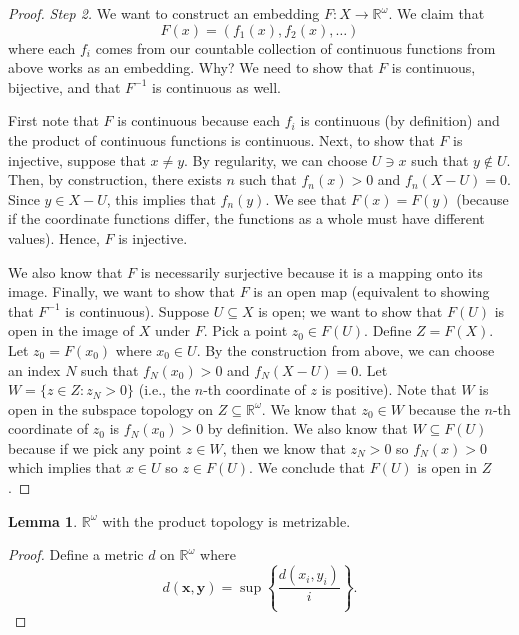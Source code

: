 \documentclass{article}
\newcommand{\nline}{\vspace*{0.5\baselineskip}}
\theoremstyle{definition}
\newtheorem{lemma}{Lemma}[subsection]
\begin{document}
\begin{flushleft}
\begin{proof}
\nline

\textit{Step 2.} We want to construct an embedding $F : X \to \mathbb{R}^\omega$. We claim that
\[
F(x) = (f_1(x), f_2(x), \dots )
\]
where each $f_i$ comes from our countable collection of continuous functions from above works as an embedding. Why? We need to show that $F$ is continuous, bijective, and that $F^{-1}$ is continuous as well.

\nline

First note that $F$ is continuous because each $f_i$ is continuous (by definition) and the product of continuous functions is continuous. Next, to show that $F$ is injective, suppose that $x \neq y$. By regularity, we can choose $U \ni x$ such that $y \notin U$. Then, by construction, there exists $n$ such that $f_n(x) > 0$ and $f_n(X - U) = 0$. Since $y \in X - U$, this implies that $f_n(y)$. We see that $F(x) = F(y)$ (because if the coordinate functions differ, the functions as a whole must have different values). Hence, $F$ is injective.

\nline

We also know that $F$ is necessarily surjective because it is a mapping onto its image. Finally, we want to show that $F$ is an open map (equivalent to showing that $F^{-1}$ is continuous). Suppose $U \subseteq X$ is open; we want to show that $F(U)$ is open in the image of $X$ under $F$. Pick a point $z_0 \in F(U)$. Define $Z = F(X)$. Let $z_0 = F(x_0)$ where $x_0 \in U$. By the construction from above, we can choose an index $N$ such that $f_N(x_0) > 0$ and $f_N(X - U) = 0$. Let $W = \{z \in Z : z_N > 0\}$ (i.e., the $n$-th coordinate of $z$ is positive). Note that $W$ is open in the subspace topology on $Z \subseteq \mathbb{R}^\omega$. We know that $z_0 \in W$ because the $n$-th coordinate of $z_0$ is $f_N(x_0) > 0$ by definition. We also know that $W \subseteq F(U)$ because if we pick any point $z \in W$, then we know that $z_N > 0$ so $f_N(x) > 0$ which implies that $x \in U$ so $z \in F(U)$. We conclude that $F(U)$ is open in $Z$.
\end{proof}

\begin{lemma}
$\mathbb{R}^\omega$ with the product topology is metrizable.
\end{lemma}

\begin{proof}
Define a metric $d$ on $\mathbb{R}^\omega$ where
\[
d(\textbf{x}, \textbf{y}) = \sup \left\{ \frac{d(x_i, y_i)}{i} \right\}.
\]
\end{proof}


\end{flushleft}
\end{document}
